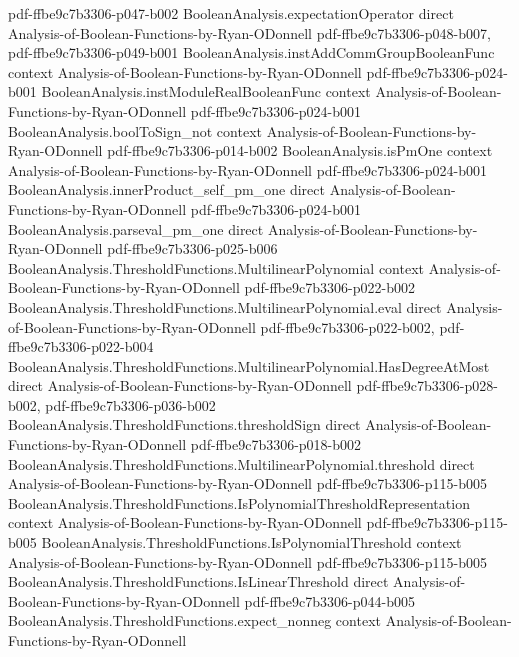 \begin{theorem}
  {pdf-ffbe9c7b3306-p047-b002}
\proofstep
  {BooleanAnalysis.expectationOperator}
  {direct}
  {Analysis-of-Boolean-Functions-by-Ryan-ODonnell}
  {pdf-ffbe9c7b3306-p048-b007,
    pdf-ffbe9c7b3306-p049-b001}
\proofstep
  {BooleanAnalysis.instAddCommGroupBooleanFunc}
  {context}
  {Analysis-of-Boolean-Functions-by-Ryan-ODonnell}
  {pdf-ffbe9c7b3306-p024-b001}
\proofstep
  {BooleanAnalysis.instModuleRealBooleanFunc}
  {context}
  {Analysis-of-Boolean-Functions-by-Ryan-ODonnell}
  {pdf-ffbe9c7b3306-p024-b001}
\proofstep
  {BooleanAnalysis.boolToSign_not}
  {context}
  {Analysis-of-Boolean-Functions-by-Ryan-ODonnell}
  {pdf-ffbe9c7b3306-p014-b002}
\proofstep
  {BooleanAnalysis.isPmOne}
  {context}
  {Analysis-of-Boolean-Functions-by-Ryan-ODonnell}
  {pdf-ffbe9c7b3306-p024-b001}
\proofstep
  {BooleanAnalysis.innerProduct_self_pm_one}
  {direct}
  {Analysis-of-Boolean-Functions-by-Ryan-ODonnell}
  {pdf-ffbe9c7b3306-p024-b001}
\proofstep
  {BooleanAnalysis.parseval_pm_one}
  {direct}
  {Analysis-of-Boolean-Functions-by-Ryan-ODonnell}
  {pdf-ffbe9c7b3306-p025-b006}
\proofstep
  {BooleanAnalysis.ThresholdFunctions.MultilinearPolynomial}
  {context}
  {Analysis-of-Boolean-Functions-by-Ryan-ODonnell}
  {pdf-ffbe9c7b3306-p022-b002}
\proofstep
  {BooleanAnalysis.ThresholdFunctions.MultilinearPolynomial.eval}
  {direct}
  {Analysis-of-Boolean-Functions-by-Ryan-ODonnell}
  {pdf-ffbe9c7b3306-p022-b002,
    pdf-ffbe9c7b3306-p022-b004}
\proofstep
  {BooleanAnalysis.ThresholdFunctions.MultilinearPolynomial.HasDegreeAtMost}
  {direct}
  {Analysis-of-Boolean-Functions-by-Ryan-ODonnell}
  {pdf-ffbe9c7b3306-p028-b002,
    pdf-ffbe9c7b3306-p036-b002}
\proofstep
  {BooleanAnalysis.ThresholdFunctions.thresholdSign}
  {direct}
  {Analysis-of-Boolean-Functions-by-Ryan-ODonnell}
  {pdf-ffbe9c7b3306-p018-b002}
\proofstep
  {BooleanAnalysis.ThresholdFunctions.MultilinearPolynomial.threshold}
  {direct}
  {Analysis-of-Boolean-Functions-by-Ryan-ODonnell}
  {pdf-ffbe9c7b3306-p115-b005}
\proofstep
  {BooleanAnalysis.ThresholdFunctions.IsPolynomialThresholdRepresentation}
  {context}
  {Analysis-of-Boolean-Functions-by-Ryan-ODonnell}
  {pdf-ffbe9c7b3306-p115-b005}
\proofstep
  {BooleanAnalysis.ThresholdFunctions.IsPolynomialThreshold}
  {context}
  {Analysis-of-Boolean-Functions-by-Ryan-ODonnell}
  {pdf-ffbe9c7b3306-p115-b005}
\proofstep
  {BooleanAnalysis.ThresholdFunctions.IsLinearThreshold}
  {direct}
  {Analysis-of-Boolean-Functions-by-Ryan-ODonnell}
  {pdf-ffbe9c7b3306-p044-b005}
\proofstep
  {BooleanAnalysis.ThresholdFunctions.expect_nonneg}
  {context}
  {Analysis-of-Boolean-Functions-by-Ryan-ODonnell}

\end{theorem}
